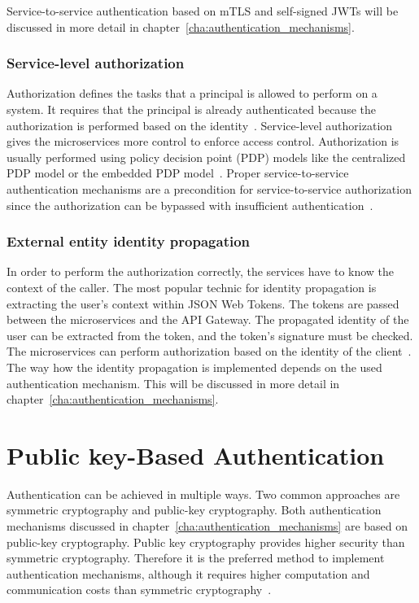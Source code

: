 Service-to-service authentication based on mTLS and self-signed JWTs will be discussed in more detail in chapter~\ref{cha:authentication_mechanisms}.

\subsubsection{Service-level authorization} 
\label{sec:service-level-authorization}
Authorization defines the tasks that a principal is allowed to perform on a system.
It requires that the principal is already authenticated because the authorization is performed based on the identity~\cite{siriwardena2014advanced}. 
Service-level authorization gives the microservices more control to enforce access control.
Authorization is usually performed using policy decision point (PDP) models like the centralized PDP model or the embedded PDP model~\cite{dias2020microservices, barabanov2020authentication}.
Proper service-to-service authentication mechanisms are a precondition for service-to-service authorization since the authorization can be bypassed with insufficient authentication~\cite{siriwardena2014advanced}.

\subsubsection{External entity identity propagation} 
\label{sec:external-entity-identity-propagation}
In order to perform the authorization correctly, the services have to know the context of the caller.
The most popular technic for identity propagation is extracting the user's context within JSON Web Tokens.
The tokens are passed between the microservices and the API Gateway.
The propagated identity of the user can be extracted from the token, and the token's signature must be checked.
The microservices can perform authorization based on the identity of the client~\cite{barabanov2020authentication, dias2020microservices}.
The way how the identity propagation is implemented depends on the used authentication mechanism.
This will be discussed in more detail in chapter~\ref{cha:authentication_mechanisms}.

\section{Public key-Based Authentication}
Authentication can be achieved in multiple ways.
Two common approaches are symmetric cryptography and public-key cryptography.
Both authentication mechanisms discussed in chapter~\ref{cha:authentication_mechanisms} are based on public-key cryptography.
Public key cryptography provides higher security than symmetric cryptography.
Therefore it is the preferred method to implement authentication mechanisms, although it requires higher computation and communication costs than symmetric cryptography~\cite{pubkeycrypto}.

